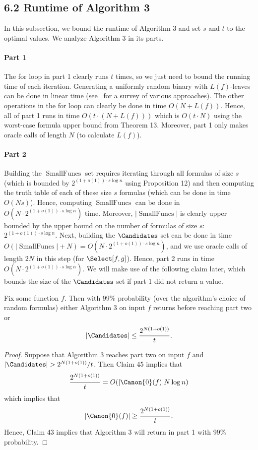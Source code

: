 \subsection*{6.2 Runtime of Algorithm 3}
In this subsection, we bound the runtime of Algorithm 3 and set $s$ and $t$ to the optimal values. We analyze Algorithm 3 in its parts.
\paragraph{Part 1}
The for loop in part 1 clearly runs $t$ times, so we just need to bound the running time of each iteration. Generating a uniformly random binary with $L(f)$-leaves can be done in linear time (see~\cite{ref15} for a survey of various approaches). The other operations in the for loop can clearly be done in time $O(N+L(f))$. Hence, all of part 1 runs in time $O(t\cdot(N+L(f)))$ which is $O(t\cdot N)$ using the worst-case formula upper bound from Theorem 13.
Moreover, part 1 only makes oracle calls of length $N$ (to calculate $L(f)$).
\paragraph{Part 2}
Building the $\operatorname{SmallFuncs}$ set requires iterating through all formulas of size $s$ (which is bounded by $2^{(1+o(1))\cdot s\log n}$ using Proposition 12) and then computing the truth table of each of these size $s$ formulas (which can be done in time $O(Ns)$). Hence, computing $\operatorname{SmallFuncs}$ can be done in $O(N\cdot 2^{(1+o(1))\cdot s\log n})$ time. Moreover, $|\operatorname{SmallFuncs}|$ is clearly upper bounded by the upper bound on the number of formulas of size $s$: $2^{(1+o(1))\cdot s\log n}$.
Next, building the $\Candidates$ set can be done in time $O(|\operatorname{SmallFuncs}|+N)=O(N\cdot 2^{(1+o(1))\cdot s\log n})$, and we use oracle calls of length $2N$ in this step (for $\Select[f,g]$).
Hence, part 2 runs in time $O(N\cdot 2^{(1+o(1))\cdot s\log n})$.
We will make use of the following claim later, which bounds the size of the $\Candidates$ set if part 1 did not return a value.
\begin{ntclaim}
Fix some function $f$. Then with 99\% probability (over the algorithm's choice of random formulas) either Algorithm 3 on input $f$ returns before reaching part two or
\[|\Candidates|\leq\frac{2^{N(1+o(1))}}t.\]
\end{ntclaim}
\begin{proof}
Suppose that Algorithm 3 reaches part two on input $f$ and $|\Candidates|>2^{N(1+o(1))}/t$. Then Claim 45 implies that
\[\frac{2^{N(1+o(1))}}t=O(|\Canon{0}(f)|N\log n)\]
which implies that
\[|\Canon{0}(f)|\geq\frac{2^{N(1+o(1))}}t.\]
Hence, Claim 43 implies that Algorithm 3 will return in part 1 with 99\% probability.
\end{proof}
